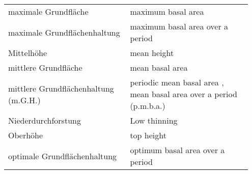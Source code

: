 \begin{singlespace}
{\begin{longtabu}{p{0.475\linewidth} p{0.475\linewidth}}
      maximale Grundfläche \parencite[p.~224]{Assmann1961} & maximum basal area \parencite[p.~229]{Assmann1970} \\
      maximale Grundflächenhaltung \parencite[p.~224]{Assmann1961} & maximum basal area over a period \parencite[p.~229]{Assmann1970} \\
      Mittelhöhe \parencite[p.~141]{Assmann1961} & mean height \parencite[p.~143]{Assmann1970} \\
      mittlere Grundfläche \parencite[p.~211]{Assmann1961} & mean basal area \parencite[p.~216]{Assmann1970} \\
      mittlere Grundflächenhaltung (m.G.H.) \parencite[p.~209, 211]{Assmann1961} & periodic mean basal area \parencite[p.~214]{Assmann1970}, mean basal area over a period (p.m.b.a.) \parencite[p.~216]{Assmann1970} \\
      Niederdurchforstung  & Low thinning \parencite[p.~160]{EFARES1953} \\
      Oberhöhe \parencite[p.~143]{Assmann1961} & top height \parencite[p.~141]{Assmann1970} \\
      optimale Grundflächenhaltung \parencite[p.~224]{Assmann1961} & optimum basal area over a period \parencite[p.~229]{Assmann1970} \\
      
    \end{longtabu}
  }
\end{singlespace}

